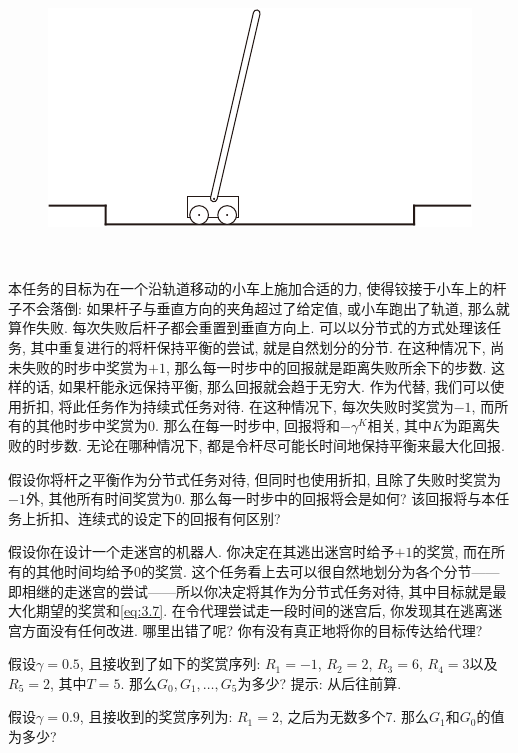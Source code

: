 \begin{figure}
\centering
\includegraphics[width=.4\textwidth]{c3/img/pole-balancing.pdf}
\end{figure}
\mbox{}~
\begin{exam}[杆之平衡]
本任务的目标为在一个沿轨道移动的小车上施加合适的力, 使得铰接于小车上的杆子不会落倒: 如果杆子与垂直方向的夹角超过了给定值, 或小车跑出了轨道, 那么就算作失败. 每次失败后杆子都会重置到垂直方向上. 可以以分节式的方式处理该任务, 其中重复进行的将杆保持平衡的尝试, 就是自然划分的分节. 在这种情况下, 尚未失败的时步中奖赏为$+1$, 那么每一时步中的回报就是距离失败所余下的步数. 这样的话, 如果杆能永远保持平衡, 那么回报就会趋于无穷大. 作为代替, 我们可以使用折扣, 将此任务作为持续式任务对待. 在这种情况下, 每次失败时奖赏为$-1$, 而所有的其他时步中奖赏为0. 那么在每一时步中, 回报将和$- \gamma^K$相关, 其中$K$为距离失败的时步数. 无论在哪种情况下, 都是令杆尽可能长时间地保持平衡来最大化回报.
\end{exam}

\begin{exer}
假设你将杆之平衡作为分节式任务对待, 但同时也使用折扣, 且除了失败时奖赏为$-1$外, 其他所有时间奖赏为0. 那么每一时步中的回报将会是如何? 该回报将与本任务上折扣、连续式的设定下的回报有何区别?
\end{exer}

\begin{exer}
假设你在设计一个走迷宫的机器人. 你决定在其逃出迷宫时给予$+1$的奖赏, 而在所有的其他时间均给予0的奖赏. 这个任务看上去可以很自然地划分为各个分节——即相继的走迷宫的尝试——所以你决定将其作为分节式任务对待, 其中目标就是最大化期望的奖赏和\eqref{eq:3.7}. 在令代理尝试走一段时间的迷宫后, 你发现其在逃离迷宫方面没有任何改进. 哪里出错了呢? 你有没有真正地将你的目标传达给代理?
\end{exer}

\begin{exer}
假设$\gamma = 0.5$, 且接收到了如下的奖赏序列: $R_1 = -1$, $R_2 = 2$, $R_3 = 6$, $R_4 = 3$以及$R_5 = 2$, 其中$T = 5$. 那么$G_0, G_1, \dots, G_5$为多少? 提示: 从后往前算.
\end{exer}

\begin{exer}
假设$\gamma = 0.9$, 且接收到的奖赏序列为: $R_1 = 2$, 之后为无数多个7. 那么$G_1$和$G_0$的值为多少?
\end{exer}

